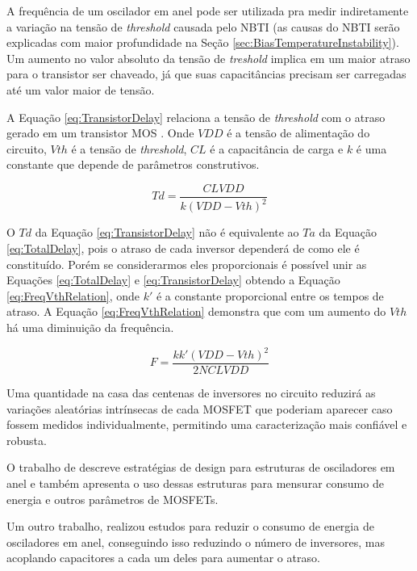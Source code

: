 A frequência de um oscilador em anel pode ser utilizada pra medir indiretamente a variação na tensão de \textit{threshold} causada pelo NBTI (as causas do NBTI serão explicadas com maior profundidade na Seção \ref{sec:BiasTemperatureInstability}). Um aumento no valor absoluto da tensão de \textit{treshold} implica em um maior atraso para o transistor ser chaveado, já que suas capacitâncias precisam ser carregadas até um valor maior de tensão.

A Equação \ref{eq:TransistorDelay} relaciona a tensão de \textit{threshold} com o atraso gerado em um transistor MOS \cite{Rjoub}. Onde $V{\scriptstyle DD}$ é a tensão de alimentação do circuito, $V{\scriptstyle th}$ é a tensão de \textit{threshold}, $C{\scriptstyle L}$ é a capacitância de carga e $k$ é uma constante que depende de parâmetros construtivos.

\begin{equation}
    Td = \frac{C{\scriptstyle {L}}V{\scriptstyle {DD}}}{k(V{\scriptstyle {DD}} - V{\scriptstyle {th}})^2}
    \label{eq:TransistorDelay}
\end{equation}

O $Td$ da Equação \ref{eq:TransistorDelay} não é equivalente ao $Ta$ da Equação \ref{eq:TotalDelay}, pois o atraso de cada inversor dependerá de como ele é constituído. Porém se considerarmos eles proporcionais é possível unir as Equações \ref{eq:TotalDelay} e \ref{eq:TransistorDelay} obtendo a Equação \ref{eq:FreqVthRelation}, onde $k'$ é a constante proporcional entre os tempos de atraso. A Equação \ref{eq:FreqVthRelation} demonstra que com um aumento do $V{\scriptstyle th}$ há uma diminuição da frequência.

\begin{equation}
    F = \frac{kk'(V{\scriptstyle {DD}} - V{\scriptstyle {th}})^2}{2NC{\scriptstyle {L}}V{\scriptstyle {DD}}}
    \label{eq:FreqVthRelation}
\end{equation}

Uma quantidade na casa das centenas de inversores no circuito reduzirá as variações aleatórias intrínsecas de cada MOSFET que poderiam aparecer caso fossem medidos individualmente, permitindo uma caracterização mais confiável e robusta.

O trabalho de \cite{Bhushan} descreve estratégias de design para estruturas de osciladores em anel e também apresenta o uso dessas estruturas para mensurar consumo de energia e outros parâmetros de MOSFETs.

Um outro trabalho, \cite{Michal} realizou estudos para reduzir o consumo de energia de osciladores em anel, conseguindo isso reduzindo o número de inversores, mas acoplando capacitores a cada um deles para aumentar o atraso.
